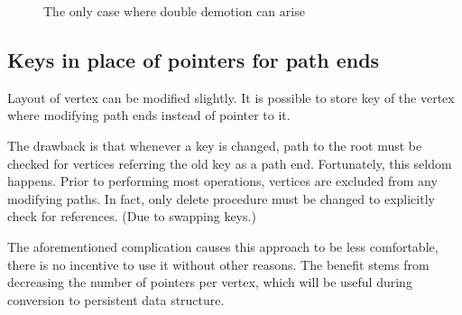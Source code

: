 \begin{figure}
\begin{center}
\qquad
{}
\qquad
{}
\qquad
{}
\end{center}
\caption{The only case where double demotion can arise}
\end{figure}

\subsection{Keys in place of pointers for path ends}

Layout of vertex can be modified slightly. It is possible to store key of the vertex where modifying path ends instead of pointer to it.

The drawback is that whenever a key is changed, path to the root must be checked for vertices referring the old key as a path end. Fortunately, this seldom happens. Prior to performing most operations, vertices are excluded from any modifying paths. In fact, only delete procedure must be changed to explicitly check for references. (Due to swapping keys.)

The aforementioned complication causes this approach to be less comfortable, there is no incentive to use it without other reasons. The benefit stems from decreasing the number of pointers per vertex, which will be useful during conversion to persistent data structure.
